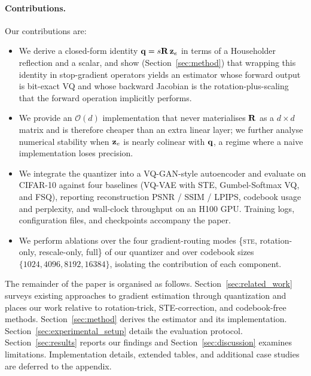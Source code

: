 \paragraph{Contributions.} Our contributions are:
\begin{itemize}[leftmargin=*,itemsep=2pt,topsep=2pt]
  \item We derive a closed-form identity $\mathbf{q} = s\mathbf{R}\,\mathbf{z}_e$ in
        terms of a Householder reflection and a scalar, and show
        (Section~\ref{sec:method}) that wrapping this identity in
        stop-gradient operators yields an estimator whose forward
        output is bit-exact VQ and whose backward Jacobian is the
        rotation-plus-scaling that the forward operation implicitly
        performs.
  \item We provide an $\mathcal{O}(d)$ implementation that never
        materialises $\mathbf{R}$ as a $d \times d$ matrix and is therefore
        cheaper than an extra linear layer; we further analyse
        numerical stability when $\mathbf{z}_e$ is nearly colinear with
        $\mathbf{q}$, a regime where a naive implementation loses
        precision.
  \item We integrate the quantizer into a VQ-GAN-style autoencoder and
        evaluate on CIFAR-10 against four baselines (VQ-VAE with STE,
        Gumbel-Softmax VQ, and FSQ), reporting reconstruction PSNR /
        SSIM / LPIPS, codebook usage and perplexity, and wall-clock
        throughput on an H100 GPU. Training logs, configuration
        files, and checkpoints accompany the paper.
  \item We perform ablations over the four gradient-routing modes
        \{\textsc{ste}, rotation-only, rescale-only, full\} of our
        quantizer and over codebook sizes $\{1024, 4096, 8192,
        16384\}$, isolating the contribution of each component.
\end{itemize}

The remainder of the paper is organised as follows.
Section~\ref{sec:related_work} surveys existing approaches to
gradient estimation through quantization and places our work relative
to rotation-trick, STE-correction, and codebook-free methods.
Section~\ref{sec:method} derives the estimator and its implementation.
Section~\ref{sec:experimental_setup} details the evaluation protocol.
Section~\ref{sec:results} reports our findings and
Section~\ref{sec:discussion} examines limitations. Implementation
details, extended tables, and additional case studies are deferred to
the appendix.
